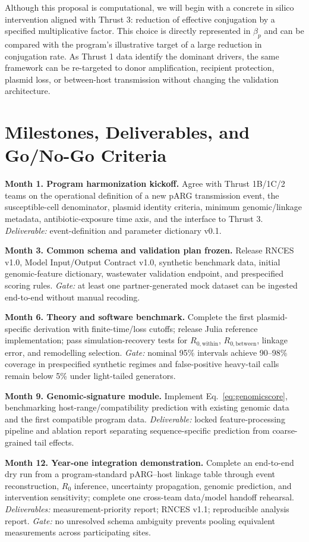 \documentclass[12pt,a4paper]{article}
\newcommand{\Rwithin}{R_{0,\mathrm{within}}}
\newcommand{\Rbetween}{R_{0,\mathrm{between}}}
\begin{document}
Although this proposal is computational, we will begin with a concrete in silico intervention aligned with Thrust 3: reduction of effective conjugation by a specified multiplicative factor. This choice is directly represented in $\beta_p$ and can be compared with the program's illustrative target of a large reduction in conjugation rate. As Thrust 1 data identify the dominant drivers, the same framework can be re-targeted to donor amplification, recipient protection, plasmid loss, or between-host transmission without changing the validation architecture.

\section{Milestones, Deliverables, and Go/No-Go Criteria}

\textbf{Month 1. Program harmonization kickoff.} Agree with Thrust 1B/1C/2 teams on the operational definition of a new pARG transmission event, the susceptible-cell denominator, plasmid identity criteria, minimum genomic/linkage metadata, antibiotic-exposure time axis, and the interface to Thrust 3. \emph{Deliverable:} event-definition and parameter dictionary v0.1.

\textbf{Month 3. Common schema and validation plan frozen.} Release RNCES v1.0, Model Input/Output Contract v1.0, synthetic benchmark data, initial genomic-feature dictionary, wastewater validation endpoint, and prespecified scoring rules. \emph{Gate:} at least one partner-generated mock dataset can be ingested end-to-end without manual recoding.

\textbf{Month 6. Theory and software benchmark.} Complete the first plasmid-specific derivation with finite-time/loss cutoffs; release Julia reference implementation; pass simulation-recovery tests for $\Rwithin$, $\Rbetween$, linkage error, and remodelling selection. \emph{Gate:} nominal 95\% intervals achieve 90--98\% coverage in prespecified synthetic regimes and false-positive heavy-tail calls remain below 5\% under light-tailed generators.

\textbf{Month 9. Genomic-signature module.} Implement Eq.~\eqref{eq:genomicscore}, benchmarking host-range/compatibility prediction with existing genomic data and the first compatible program data. \emph{Deliverable:} locked feature-processing pipeline and ablation report separating sequence-specific prediction from coarse-grained tail effects.

\textbf{Month 12. Year-one integration demonstration.} Complete an end-to-end dry run from a program-standard pARG--host linkage table through event reconstruction, $R_0$ inference, uncertainty propagation, genomic prediction, and intervention sensitivity; complete one cross-team data/model handoff rehearsal. \emph{Deliverables:} measurement-priority report; RNCES v1.1; reproducible analysis report. \emph{Gate:} no unresolved schema ambiguity prevents pooling equivalent measurements across participating sites.
\end{document}
